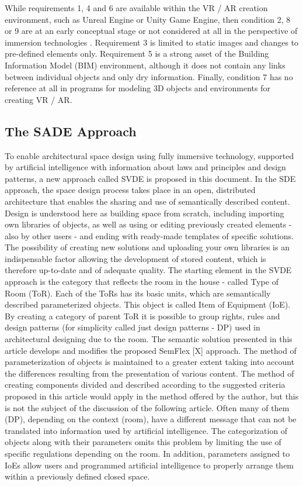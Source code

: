 \documentclass[runningheads]{llncs}
\begin{document}
While requirements 1, 4 and 6 are available within the VR / AR creation environment, such as Unreal Engine or Unity Game Engine, then condition 2, 8 or 9 are at an early conceptual stage or not considered at all in the perspective of immersion technologies . Requirement 3 is limited to static images and changes to pre-defined elements only. Requirement 5 is a strong asset of the Building Information Model (BIM) environment, although it does not contain any links between individual objects and only dry information. Finally, condition 7 has no reference at all in programs for modeling 3D objects and environments for creating VR / AR.


\subsection{The SADE Approach}
To enable architectural space design using fully immersive technology, supported by artificial intelligence with information about laws and principles and design patterns, a new approach called SVDE is proposed in this document.
In the SDE approach, the space design process takes place in an open, distributed architecture that enables the sharing and use of semantically described content. Design is understood here as building space from scratch, including importing own libraries of objects, as well as using or editing previously created elements - also by other users - and ending with ready-made templates of specific solutions. The possibility of creating new solutions and uploading your own libraries is an indispensable factor allowing the development of stored content, which is therefore up-to-date and of adequate quality.
The starting element in the SVDE approach is the category that reflects the room in the house - called Type of Room (ToR). Each of the ToRs has its basic units, which are semantically described parameterized objects. This object is called Item of Equipment (IoE).
By creating a category of parent ToR it is possible to group rights, rules and design patterns (for simplicity called just design patterns - DP) used in architectural designing due to the room. The semantic solution presented in this article develops and modifies the proposed SemFlex [X] approach. The method of parameterization of objects is maintained to a greater extent taking into account the differences resulting from the presentation of various content. The method of creating components divided and described according to the suggested criteria proposed in this article would apply in the method offered by the author, but this is not the subject of the discussion of the following article. Often many of them (DP), depending on the context (room), have a different message that can not be translated into information used by artificial intelligence. The categorization of objects along with their parameters omits this problem by limiting the use of specific regulations depending on the room. In addition, parameters assigned to IoEs allow users and programmed artificial intelligence to properly arrange them within a previously defined closed space.
\end{document}

